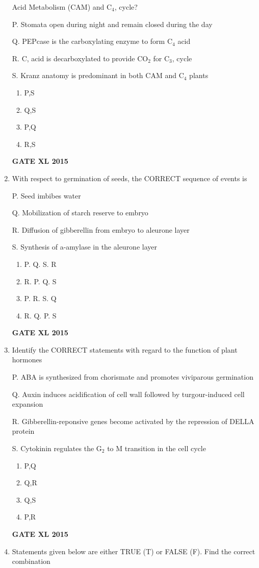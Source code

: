 \documentclass[journal,12pt,onecolumn]{IEEEtran}
\begin{document}
\begin{enumerate}
	Acid Metabolism (CAM) and C$_4$, cycle?

P. Stomata open during night and remain closed during the day

Q. PEPcase is the carboxylating enzyme to form C$_4$ acid

R. C, acid is decarboxylated to provide CO$_2$ for C$_3$, cycle

S. Kranz anatomy is predominant in both CAM and C$_4$ plants
    \begin{enumerate}
            \item P,S
	    \item Q,S
	    \item P,Q
            \item R,S
    \end{enumerate}
\hfill{\textbf{GATE XL 2015}}
\item With respect to germination of seeds, the CORRECT sequence of events is

P. Seed imbibes water

Q. Mobilization of starch reserve to embryo

R. Diffusion of gibberellin from embryo to aleurone layer

S. Synthesis of a-amylase in the aleurone layer
    \begin{enumerate}
            \item P. Q. S. R
	    \item R. P. Q. S
	    \item P. R. S. Q
            \item R. Q. P. S
    \end{enumerate}
\hfill{\textbf{GATE XL 2015}}
\item 
Identify the CORRECT statements with regard to the function of plant hormones

P. ABA is synthesized from chorismate and promotes viviparous germination

Q. Auxin induces acidification of cell wall followed by turgour-induced cell expansion

R. Gibberellin-reponsive genes become activated by the repression of DELLA protein

S. Cytokinin regulates the G$_2$ to M transition in the cell cycle
    \begin{enumerate}
            \item P,Q
	    \item Q,R
	    \item Q,S
            \item P,R
    \end{enumerate}
\hfill{\textbf{GATE XL 2015}}
\item Statements given below are either TRUE (T) or FALSE (F). Find the correct combination


\end{enumerate}
\end{document}
